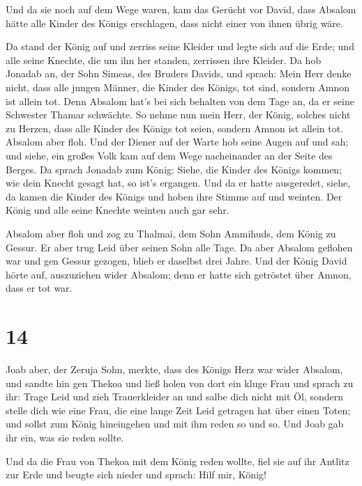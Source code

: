  Und da sie noch auf dem Wege waren, kam das Gerücht vor
David, dass Absalom hätte alle Kinder des Königs erschlagen, dass nicht
einer von ihnen übrig wäre.

 Da stand der König auf und zerriss seine Kleider und
legte sich auf die Erde; und alle seine Knechte, die um ihn her standen,
zerrissen ihre Kleider.  Da hob Jonadab an, der Sohn
Simeas, des Bruders Davids, und sprach: Mein Herr denke nicht, dass alle
jungen Männer, die Kinder des Königs, tot sind, sondern Amnon ist allein
tot. Denn Absalom hat's bei sich behalten von dem Tage an, da er seine
Schwester Thamar schwächte.  So nehme nun mein Herr, der
König, solches nicht zu Herzen, dass alle Kinder des Königs tot seien,
sondern Amnon ist allein tot.  Absalom aber floh. Und der
Diener auf der Warte hob seine Augen auf und sah; und siehe, ein großes
Volk kam auf dem Wege nacheinander an der Seite des Berges.
 Da sprach Jonadab zum König: Siehe, die Kinder des
Königs kommen; wie dein Knecht gesagt hat, so ist's ergangen.
 Und da er hatte ausgeredet, siehe, da kamen die Kinder
des Königs und hoben ihre Stimme auf und weinten. Der König und alle
seine Knechte weinten auch gar sehr.

 Absalom aber floh und zog zu Thalmai, dem Sohn Ammihuds,
dem König zu Gessur. Er aber trug Leid über seinen Sohn alle Tage.
 Da aber Absalom geflohen war und gen Gessur gezogen,
blieb er daselbst drei Jahre.  Und der König David hörte
auf, auszuziehen wider Absalom; denn er hatte sich getröstet über Amnon,
dass er tot war.

\hypertarget{section-13}{%
\section{14}\label{section-13}}

 Joab aber, der Zeruja Sohn, merkte, dass des Königs Herz
war wider Absalom,  und sandte hin gen Thekoa und ließ
holen von dort ein kluge Frau und sprach zu ihr: Trage Leid und zieh
Trauerkleider an und salbe dich nicht mit Öl, sondern stelle dich wie
eine Frau, die eine lange Zeit Leid getragen hat über einen Toten;
 und sollst zum König hineingehen und mit ihm reden so und
so. Und Joab gab ihr ein, was sie reden sollte.

 Und da die Frau von Thekoa mit dem König reden wollte,
fiel sie auf ihr Antlitz zur Erde und beugte sich nieder und sprach:
Hilf mir, König!

